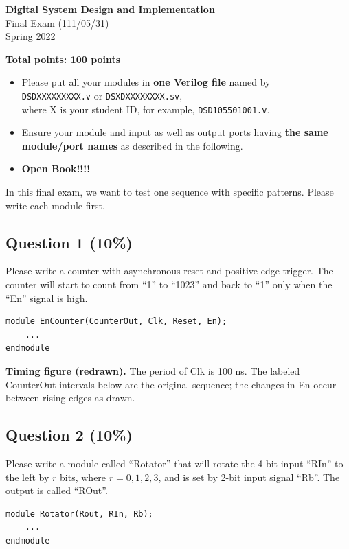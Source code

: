 \documentclass[11pt,a4paper]{article}
\newcommand{\question}[2]{\subsection*{Question #1 \hfill (#2\%)}}
\newcommand{\signal}[1]{\texttt{#1}}
\newcommand{\bus}[3]{%
  \draw (#2,#1)--({#2+.13},{#1+.17})--({#2+.87},{#1+.17})--({#2+1},#1)
    --({#2+.87},{#1-.17})--({#2+.13},{#1-.17})--cycle;
  \node[font=\scriptsize] at ({#2+.5},#1) {#3};}
\newcommand{\clockrow}[2]{%
  \node[anchor=east,font=\small] at (-.2,#1) {Clk};
  \foreach \i in {0,...,#2} {
    \draw (\i,#1)--(\i,{#1+.3})--({\i+.5},{#1+.3})--({\i+.5},#1)--({\i+1},#1);}}
\begin{document}
\setlength{\emergencystretch}{2em}
\begin{center}
{\Large\bfseries Digital System Design and Implementation}\\[5pt]
{\large Final Exam (111/05/31)}\\
Spring 2022
\end{center}
\textbf{Total points: 100 points}
\begin{itemize}
\item Please put all your modules in \textbf{one Verilog file} named by\\
\signal{DSDXXXXXXXXX.v} or \signal{DSXDXXXXXXXX.sv},\\
where X is your student ID,
for example, \signal{DSD105501001.v}.
\item Ensure your module and input as well as output ports having
\textbf{the same module/port names} as described in the following.
\item \textbf{Open Book!!!!}
\end{itemize}

In this final exam, we want to test one sequence with specific patterns.
Please write each module first.

\question{1}{10}
Please write a counter with asynchronous reset and positive edge trigger.
The counter will start to count from ``1'' to ``1023'' and back to ``1''
only when the ``En'' signal is high.
\begin{verbatim}
module EnCounter(CounterOut, Clk, Reset, En);
    ...
endmodule
\end{verbatim}
\textbf{Timing figure (redrawn).} The period of Clk is 100 ns. The labeled
CounterOut intervals below are the original sequence; the changes in En
occur between rising edges as drawn.
\begin{center}
\end{center}

\question{2}{10}
Please write a module called ``Rotator'' that will rotate the 4-bit input
``RIn'' to the left by $r$ bits, where $r=0,1,2,3$, and is set by 2-bit
input signal ``Rb''. The output is called ``ROut''.
\begin{verbatim}
module Rotator(Rout, RIn, Rb);
    ...
endmodule
\end{verbatim}
\end{document}
